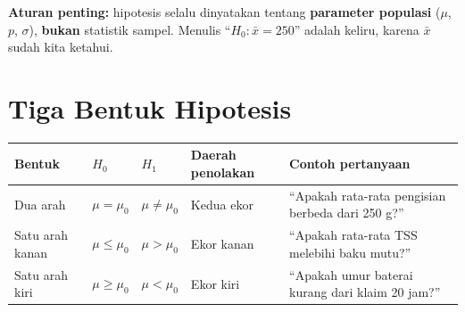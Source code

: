 \documentclass[
  indonesian,
  letterpaper,
]{book}
\newcounter{none} %
\begin{document}
\begin{tcolorbox}[enhanced jigsaw, arc=.35mm, bottomrule=.15mm, bottomtitle=1mm, breakable, colback=white, colbacktitle=quarto-callout-important-color!10!white, colframe=quarto-callout-important-color-frame, coltitle=black, left=2mm, leftrule=.75mm, opacityback=0, opacitybacktitle=0.6, rightrule=.15mm, title=\textcolor{quarto-callout-important-color}{\faExclamation}\hspace{0.5em}{Penting}, titlerule=0mm, toprule=.15mm, toptitle=1mm]

\textbf{Aturan penting:} hipotesis selalu dinyatakan tentang
\textbf{parameter populasi} (\(\mu\), \(p\), \(\sigma\)), \textbf{bukan}
statistik sampel. Menulis ``\(H_0: \bar{x} = 250\)'' adalah keliru,
karena \(\bar{x}\) sudah kita ketahui.

\end{tcolorbox}

\section{Tiga Bentuk Hipotesis}\label{tiga-bentuk-hipotesis}

{\def\LTcaptype{none} %
\begin{longtable}[]{@{}
  >{\raggedright\arraybackslash}p{}
  >{\raggedright\arraybackslash}p{}
  >{\raggedright\arraybackslash}p{}
  >{\raggedright\arraybackslash}p{}
  >{\raggedright\arraybackslash}p{}@{}}
\toprule\noalign{}
\begin{minipage}[b]{\linewidth}\raggedright
Bentuk
\end{minipage} & \begin{minipage}[b]{\linewidth}\raggedright
\(H_0\)
\end{minipage} & \begin{minipage}[b]{\linewidth}\raggedright
\(H_1\)
\end{minipage} & \begin{minipage}[b]{\linewidth}\raggedright
Daerah penolakan
\end{minipage} & \begin{minipage}[b]{\linewidth}\raggedright
Contoh pertanyaan
\end{minipage} \\
\midrule\noalign{}
\endhead
\bottomrule\noalign{}
\endlastfoot
Dua arah & \(\mu = \mu_0\) & \(\mu \ne \mu_0\) & Kedua ekor & ``Apakah
rata-rata pengisian berbeda dari 250 g?'' \\
Satu arah kanan & \(\mu \le \mu_0\) & \(\mu > \mu_0\) & Ekor kanan &
``Apakah rata-rata TSS melebihi baku mutu?'' \\
Satu arah kiri & \(\mu \ge \mu_0\) & \(\mu < \mu_0\) & Ekor kiri &
``Apakah umur baterai kurang dari klaim 20 jam?'' \\
\end{longtable}
}
\end{document}
